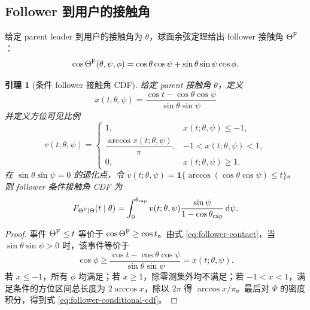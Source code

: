 \documentclass[UTF8,a4paper,11pt]{ctexart}
\newtheorem{lemma}{引理}[section]
\newcommand{\dd}{\,\mathrm d}
\newcommand{\ind}{\mathbf 1}
\newcommand{\thetac}{\theta_{\mathrm{cap}}}
\begin{document}
\subsection{Follower 到用户的接触角}

给定 parent leader 到用户的接触角为 $\theta$，球面余弦定理给出 follower 接触角
$\Theta^{\rm F}$：
\begin{equation}
 \cos\Theta^{\rm F}(\theta,\psi,\phi)
 =
 \cos\theta\cos\psi+\sin\theta\sin\psi\cos\phi.
 \label{eq:follower-contact}
\end{equation}

\begin{lemma}[条件 follower 接触角 CDF]
给定 parent 接触角 $\theta$，定义
\begin{equation}
 x(t;\theta,\psi)
 =
 \frac{\cos t-\cos\theta\cos\psi}
 {\sin\theta\sin\psi}
 \label{eq:azimuth-threshold}
\end{equation}
并定义方位可见比例
\begin{equation}
 v(t;\theta,\psi)=
 \begin{cases}
 1, & x(t;\theta,\psi)\leq-1,\\
 \dfrac{\arccos x(t;\theta,\psi)}{\pi},
   & -1<x(t;\theta,\psi)<1,\\
 0, & x(t;\theta,\psi)\geq1.
 \end{cases}
 \label{eq:azimuth-fraction}
\end{equation}
在 $\sin\theta\sin\psi=0$ 的退化点，令
$v(t;\theta,\psi)=\ind\{\arccos(\cos\theta\cos\psi)\leq t\}$。
则 follower 条件接触角 CDF 为
\begin{equation}
 F_{\Theta^{\rm F}\mid\Theta}(t\mid\theta)
 =
 \int_0^{\thetac}
 v(t;\theta,\psi)
 \frac{\sin\psi}{1-\cos\thetac}\dd\psi.
 \label{eq:follower-conditional-cdf}
\end{equation}
\end{lemma}

\begin{proof}
事件 $\Theta^{\rm F}\leq t$ 等价于
$\cos\Theta^{\rm F}\geq\cos t$。由式 \eqref{eq:follower-contact}，当
$\sin\theta\sin\psi>0$ 时，该事件等价于
\begin{equation}
 \cos\phi\geq
 \frac{\cos t-\cos\theta\cos\psi}{\sin\theta\sin\psi}
 =x(t;\theta,\psi).
\end{equation}
若 $x\leq-1$，所有 $\phi$ 均满足；若 $x\geq1$，除零测集外均不满足；若
$-1<x<1$，满足条件的方位区间总长度为 $2\arccos x$，除以 $2\pi$ 得
$\arccos x/\pi$。最后对 $\Psi$ 的密度积分，得到式
\eqref{eq:follower-conditional-cdf}。
\end{proof}
\end{document}
